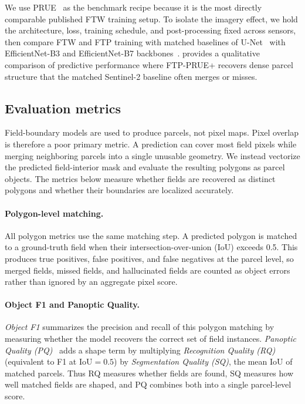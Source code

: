 \documentclass[10pt,twocolumn,letterpaper]{article}
\begin{document}
We use PRUE~\cite{muhawenayo2026prue} as the benchmark recipe because it is the most directly comparable published FTW training setup. To isolate the imagery effect, we hold the architecture, loss, training schedule, and post-processing fixed across sensors, then compare FTW and FTP training with matched baselines of U-Net~\cite{ronneberger2015unet} with EfficientNet-B3 and EfficientNet-B7 backbones~\cite{tan2019efficientnet}.  provides a qualitative comparison of predictive performance where FTP-PRUE+ recovers dense parcel structure that the matched Sentinel-2 baseline often merges or misses.

\subsection{Evaluation metrics}
\label{sec:eval-metrics}
Field-boundary models are used to produce parcels, not pixel maps. Pixel overlap is therefore a poor primary metric. A prediction can cover most field pixels while merging neighboring parcels into a single unusable geometry. We instead vectorize the predicted field-interior mask and evaluate the resulting polygons as parcel objects. The metrics below measure whether fields are recovered as distinct polygons and whether their boundaries are localized accurately.

\paragraph{Polygon-level matching.}
All polygon metrics use the same matching step. A predicted polygon is matched to a ground-truth field when their intersection-over-union (IoU) exceeds 0.5. This produces true positives, false positives, and false negatives at the parcel level, so merged fields, missed fields, and hallucinated fields are counted as object errors rather than ignored by an aggregate pixel score.

\paragraph{Object F1 and Panoptic Quality.}
\textit{Object F1} summarizes the precision and recall of this polygon matching by measuring whether the model recovers the correct set of field instances. \textit{Panoptic Quality (PQ)}~\cite{kirillov2019panoptic} adds a shape term by multiplying \textit{Recognition Quality (RQ)} (equivalent to F1 at IoU$=0.5$) by \textit{Segmentation Quality (SQ)}, the mean IoU of matched parcels. Thus RQ measures whether fields are found, SQ measures how well matched fields are shaped, and PQ combines both into a single parcel-level score.
\end{document}
